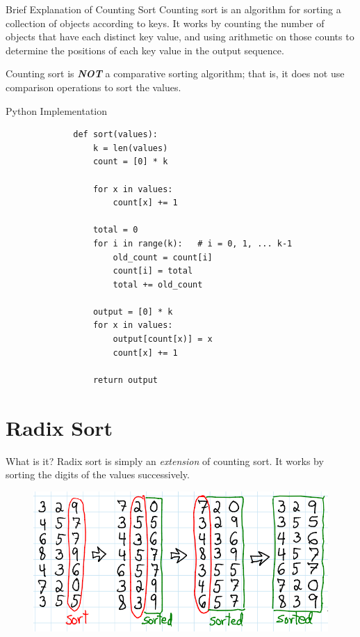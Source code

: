 \documentclass{beamer}
\begin{document}
\begin{frame}{Brief Explanation of Counting Sort}
Counting sort is an algorithm for sorting a collection of objects according to keys. It works by counting the number of objects that have each distinct key value, and using arithmetic on those counts to determine the positions of each key value in the output sequence.

Counting sort is \textbf{\textit{NOT}} a comparative sorting algorithm; that is, it does not use comparison operations to sort the values.
\end{frame}

\begin{frame}[fragile]{Python Implementation}
\begin{figure}[h]
    \centering
    \begin{lstlisting}
        def sort(values):
            k = len(values)
            count = [0] * k

            for x in values:
                count[x] += 1
            
            total = 0
            for i in range(k):   # i = 0, 1, ... k-1
                old_count = count[i]
                count[i] = total
                total += old_count
            
            output = [0] * k
            for x in values:
                output[count[x)] = x
                count[x] += 1
            
            return output
    \end{lstlisting}
\end{figure}
\end{frame}

\section{Radix Sort}

\begin{frame}{What is it?}
Radix sort is simply an \textit{extension} of counting sort. It works by sorting the digits of the values successively.

\begin{figure}
    \centering
    \includegraphics[width=\textwidth]{lessons/images/radix_sort.png}
\end{figure}

\end{frame}
\end{document}
